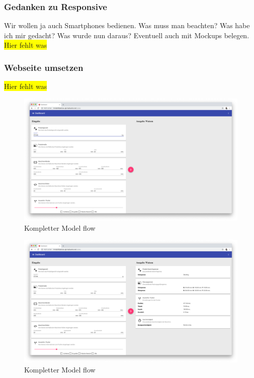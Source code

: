 \subsubsection{Gedanken zu Responsive}
Wir wollen ja auch Smartphones bedienen. Was muss man beachten? Was habe ich mir gedacht? Was wurde nun daraus?
Eventuell auch mit Mockups belegen.
\colorbox{yellow}{Hier fehlt was}

\subsubsection{Webseite umsetzen}
\colorbox{yellow}{Hier fehlt was}

\begin{figure}[h]
    \centering
    \includegraphics[width=\textwidth]{images/kapitel_4/website_input.png}
    \caption{Kompletter Model flow}
    \label{fig:umsetzung_website_input}
\end{figure}

\begin{figure}[h]
    \centering
    \includegraphics[width=\textwidth]{images/kapitel_4/website_output.png}
    \caption{Kompletter Model flow}
    \label{fig:umsetzung_website_output}
\end{figure}

